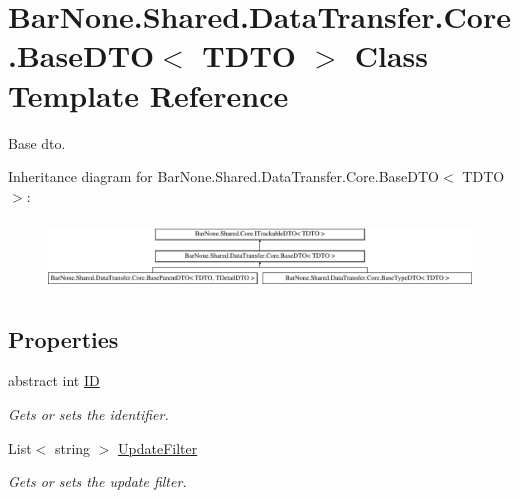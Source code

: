 \hypertarget{class_bar_none_1_1_shared_1_1_data_transfer_1_1_core_1_1_base_d_t_o}{}\section{Bar\+None.\+Shared.\+Data\+Transfer.\+Core.\+Base\+D\+TO$<$ T\+D\+TO $>$ Class Template Reference}
\label{class_bar_none_1_1_shared_1_1_data_transfer_1_1_core_1_1_base_d_t_o}


Base dto.  


Inheritance diagram for Bar\+None.\+Shared.\+Data\+Transfer.\+Core.\+Base\+D\+TO$<$ T\+D\+TO $>$\+:\begin{figure}[H]
\begin{center}
\leavevmode
\includegraphics[height=1.862528cm]{class_bar_none_1_1_shared_1_1_data_transfer_1_1_core_1_1_base_d_t_o}
\end{center}
\end{figure}
\subsection*{Properties}
\begin{DoxyCompactItemize}
\item 
abstract int \mbox{\hyperlink{class_bar_none_1_1_shared_1_1_data_transfer_1_1_core_1_1_base_d_t_o_a16c72c2cd02c98dc7afa2983bb5f44bd}{ID}}
\begin{DoxyCompactList}\small\item\em Gets or sets the identifier. \end{DoxyCompactList}\item 
List$<$ string $>$ \mbox{\hyperlink{class_bar_none_1_1_shared_1_1_data_transfer_1_1_core_1_1_base_d_t_o_af827115acc551117b7f774a6e3f0675f}{Update\+Filter}}
\begin{DoxyCompactList}\small\item\em Gets or sets the update filter. \end{DoxyCompactList}\end{DoxyCompactItemize}


